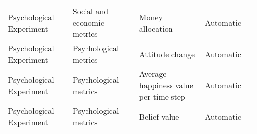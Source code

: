 \begin{small}
\begin{center}
\begin{longtable}{@{}p{}p{}p{}p{}p{}@{}}
Psychological Experiment & Social and economic metrics         & Money allocation                                                                                                                                                                                            & Automatic & \cite{lei2024fairmindsim}                                                                                                                                                                                                                                                                                                                                                                                                   \\
Psychological Experiment & Psychological metrics & Attitude change                                                                                                                                                                                             & Automatic & \cite{Wang2023UserBS}                                                                                                                                                                                                                                                                                                                                                                                            \\
Psychological Experiment & Psychological metrics & Average happiness value per time step                                                                                                                                                                       & Automatic & \cite{He2024AFSPPAF}                                                                                                                                                                                                                                                                                                                                                                                                \\
Psychological Experiment & Psychological metrics & Belief value                                                                                                                                                                                                & Automatic & \cite{lei2024fairmindsim}                                                                                                                                                                                                                                                                                                                                                                                                   \\

\end{longtable}
\end{center}
\end{small}
